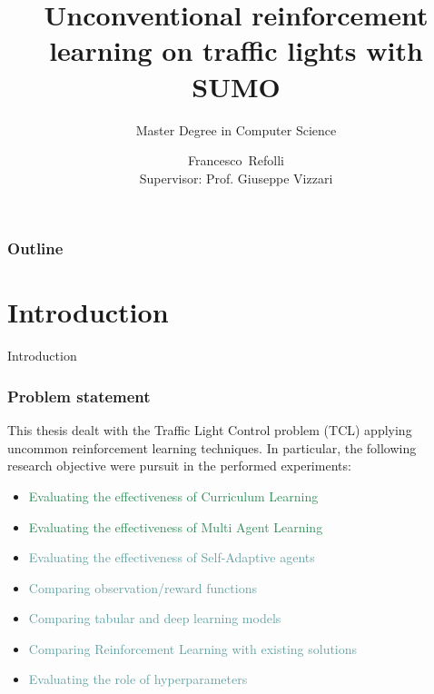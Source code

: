\documentclass[dvipsnames]{beamer}
\date[26 September 2025]{}
\title[SUMO, Curriculums and MARL]{Unconventional reinforcement learning on traffic lights with SUMO}
\subtitle{Master Degree in Computer Science}
\author[R.F. 865955]{Francesco~Refolli\\[10mm]{\small Supervisor: Prof. Giuseppe Vizzari}}
\begin{document}
\frame{\titlepage}


\begin{frame}
\frametitle{Outline}
\tableofcontents
\end{frame}

\section{Introduction}
\begin{frame}
\centering
\Huge
Introduction
\end{frame}

\begin{frame}
  \frametitle{Problem statement}

  This thesis dealt with the Traffic Light Control problem (TCL) applying uncommon reinforcement learning techniques.
  In particular, the following research objective were pursuit in the performed experiments:

  \begin{itemize}
    \item \textcolor{SeaGreen}{Evaluating the effectiveness of Curriculum Learning}
    \item \textcolor{SeaGreen}{Evaluating the effectiveness of Multi Agent Learning}
    \item \textcolor{CadetBlue}{Evaluating the effectiveness of Self-Adaptive agents}
    \item \textcolor{CadetBlue}{Comparing observation/reward functions}
    \item \textcolor{CadetBlue}{Comparing tabular and deep learning models}
    \item \textcolor{CadetBlue}{Comparing Reinforcement Learning with existing solutions}
    \item \textcolor{CadetBlue}{Evaluating the role of hyperparameters}
  \end{itemize}
\end{frame}
\end{document}
